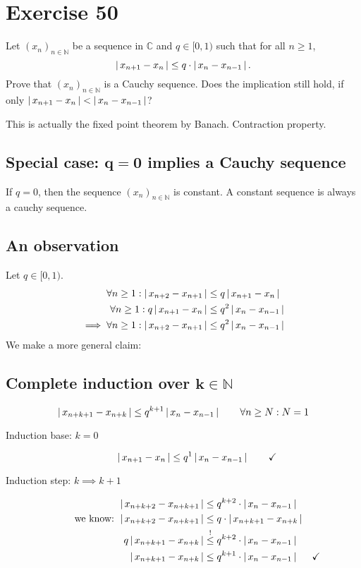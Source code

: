 \documentclass[a4paper]{article}
\theoremstyle{definition}
\newcommand\abs[1]{\left|\thinspace #1\thinspace\right|}
\newcommand\seq[1]{\left(#1\right)_{n\in\mathbb N}}
\begin{document}
\section{Exercise 50}
\begin{ex}
  Let $\seq{x_n}$ be a sequence in $\mathbb C$ and $q \in [0, 1)$ such that for all $n \geq 1$,
  \[ \abs{x_{n+1} - x_n} \leq q \cdot \abs{x_n - x_{n-1}}. \]
  Prove that $\seq{x_n}$ is a Cauchy sequence. Does the implication still hold, if only
  $\abs{x_{n+1} - x_n} < \abs{x_n - x_{n-1}}$?
\end{ex}

This is actually the fixed point theorem by Banach. Contraction property.

\subsection{Special case: $\mathbf{q=0}$ implies a Cauchy sequence}
%
If $q = 0$, then the sequence $\seq{x_n}$ is constant.
A constant sequence is always a cauchy sequence.

\subsection{An observation}
%
Let $q \in [0, 1)$.
\begin{align*}
  \forall n \geq 1: \abs{x_{n+2} - x_{n+1}} &\leq q \abs{x_{n+1} - x_n} \\
  \forall n \geq 1: q \abs{x_{n+1} - x_n} &\leq q^2 \abs{x_n - x_{n-1}} \\
  \implies \forall n \geq 1: \abs{x_{n+2} - x_{n+1}} &\leq q^2 \abs{x_n - x_{n-1}}
\end{align*}
We make a more general claim:

\subsection{Complete induction over $\mathbf{k \in \mathbb N}$}
%
\[ \abs{x_{n+k+1} - x_{n+k}} \leq q^{k+1} \abs{x_n - x_{n-1}} \qquad \forall n \geq N: N = 1 \]
\begin{description}
  \item[Induction base: $k = 0$]
    \[ \abs{x_{n+1} - x_n} \leq q^1 \abs{x_n - x_{n-1}} \qquad \checkmark \]
  \item[Induction step: $k \implies k + 1$]
    \begin{align*}
      \abs{x_{n+k+2} - x_{n+k+1}} &\leq q^{k+2} \cdot \abs{x_n - x_{n-1}} \\
      \text{we know: } \abs{x_{n+k+2} - x_{n+k+1}} &\leq q \cdot \abs{x_{n+k+1} - x_{n+k}} \\
      q \abs{x_{n+k+1} - x_{n+k}} &\stackrel{!}{\leq} q^{k+2} \cdot \abs{x_n - x_{n-1}} \\
      \abs{x_{n+k+1} - x_{n+k}} &\leq q^{k+1} \cdot \abs{x_n - x_{n-1}} &\checkmark
    \end{align*}
\end{description}
\end{document}
